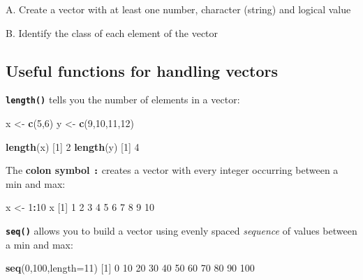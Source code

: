 \documentclass[
]{book}
\newenvironment{Shaded}{\begin{snugshade}}{\end{snugshade}}
\newcommand{\DataTypeTok}[1]{\textcolor[rgb]{0.13,0.29,0.53}{#1}}
\newcommand{\DecValTok}[1]{\textcolor[rgb]{0.00,0.00,0.81}{#1}}
\newcommand{\KeywordTok}[1]{\textcolor[rgb]{0.13,0.29,0.53}{\textbf{#1}}}
\newcommand{\NormalTok}[1]{#1}
\newcommand{\OperatorTok}[1]{\textcolor[rgb]{0.81,0.36,0.00}{\textbf{#1}}}
\newcommand{\StringTok}[1]{\textcolor[rgb]{0.31,0.60,0.02}{#1}}
\begin{document}
A. Create a vector with at least one number, character (string) and logical value

B. Identify the class of each element of the vector

\hypertarget{useful-functions-for-handling-vectors}{%
\subsection*{Useful functions for handling vectors}\label{useful-functions-for-handling-vectors}}

\textbf{\texttt{length()}} tells you the number of elements in a vector:

\begin{Shaded}
\begin{Highlighting}[]
\NormalTok{x <-}\StringTok{ }\KeywordTok{c}\NormalTok{(}\DecValTok{5}\NormalTok{,}\DecValTok{6}\NormalTok{)}
\NormalTok{y <-}\StringTok{ }\KeywordTok{c}\NormalTok{(}\DecValTok{9}\NormalTok{,}\DecValTok{10}\NormalTok{,}\DecValTok{11}\NormalTok{,}\DecValTok{12}\NormalTok{)}

\KeywordTok{length}\NormalTok{(x)}
\NormalTok{[}\DecValTok{1}\NormalTok{] }\DecValTok{2}
\KeywordTok{length}\NormalTok{(y)}
\NormalTok{[}\DecValTok{1}\NormalTok{] }\DecValTok{4}
\end{Highlighting}
\end{Shaded}

The \textbf{colon symbol \texttt{:}} creates a vector with every integer occurring between a min and max:

\begin{Shaded}
\begin{Highlighting}[]
\NormalTok{x <-}\StringTok{ }\DecValTok{1}\OperatorTok{:}\DecValTok{10}
\NormalTok{x}
\NormalTok{ [}\DecValTok{1}\NormalTok{]  }\DecValTok{1}  \DecValTok{2}  \DecValTok{3}  \DecValTok{4}  \DecValTok{5}  \DecValTok{6}  \DecValTok{7}  \DecValTok{8}  \DecValTok{9} \DecValTok{10}
\end{Highlighting}
\end{Shaded}

\textbf{\texttt{seq()}} allows you to build a vector using evenly spaced \emph{sequence} of values between a min and max:

\begin{Shaded}
\begin{Highlighting}[]
\KeywordTok{seq}\NormalTok{(}\DecValTok{0}\NormalTok{,}\DecValTok{100}\NormalTok{,}\DataTypeTok{length=}\DecValTok{11}\NormalTok{)}
\NormalTok{ [}\DecValTok{1}\NormalTok{]   }\DecValTok{0}  \DecValTok{10}  \DecValTok{20}  \DecValTok{30}  \DecValTok{40}  \DecValTok{50}  \DecValTok{60}  \DecValTok{70}  \DecValTok{80}  \DecValTok{90} \DecValTok{100}
\end{Highlighting}
\end{Shaded}
\end{document}
